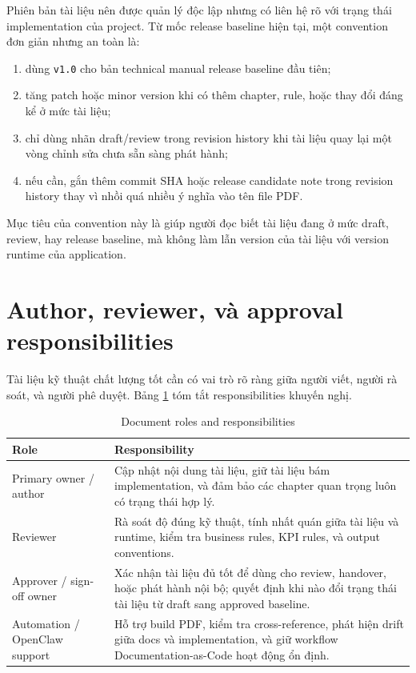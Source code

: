 Phiên bản tài liệu nên được quản lý độc lập nhưng có liên hệ rõ với trạng thái implementation của project. Từ mốc release baseline hiện tại, một convention đơn giản nhưng an toàn là:

\begin{enumerate}[label=-]
\item dùng \texttt{v1.0} cho bản technical manual release baseline đầu tiên;
\item tăng patch hoặc minor version khi có thêm chapter, rule, hoặc thay đổi đáng kể ở mức tài liệu;
\item chỉ dùng nhãn draft/review trong revision history khi tài liệu quay lại một vòng chỉnh sửa chưa sẵn sàng phát hành;
\item nếu cần, gắn thêm commit SHA hoặc release candidate note trong revision history thay vì nhồi quá nhiều ý nghĩa vào tên file PDF.
\end{enumerate}

Mục tiêu của convention này là giúp người đọc biết tài liệu đang ở mức draft, review, hay release baseline, mà không làm lẫn version của tài liệu với version runtime của application.

\section{Author, reviewer, và approval responsibilities}

Tài liệu kỹ thuật chất lượng tốt cần có vai trò rõ ràng giữa người viết, người rà soát, và người phê duyệt. Bảng \ref{tab:document_roles} tóm tắt responsibilities khuyến nghị.

\begin{table}[htbp]
	\centering
	\renewcommand{\arraystretch}{1.3}
	\caption{Document roles and responsibilities}
	\label{tab:document_roles}
	\begin{tabularx}{\linewidth}{|>{\RaggedRight\arraybackslash}p{2.7cm}|>{\RaggedRight\arraybackslash}X|}
		\hline
		\textbf{Role} & \textbf{Responsibility} \\ \hline
		Primary owner / author & Cập nhật nội dung tài liệu, giữ tài liệu bám implementation, và đảm bảo các chapter quan trọng luôn có trạng thái hợp lý. \\ \hline
		Reviewer & Rà soát độ đúng kỹ thuật, tính nhất quán giữa tài liệu và runtime, kiểm tra business rules, KPI rules, và output conventions. \\ \hline
		Approver / sign-off owner & Xác nhận tài liệu đủ tốt để dùng cho review, handover, hoặc phát hành nội bộ; quyết định khi nào đổi trạng thái tài liệu từ draft sang approved baseline. \\ \hline
		Automation / OpenClaw support & Hỗ trợ build PDF, kiểm tra cross-reference, phát hiện drift giữa docs và implementation, và giữ workflow Documentation-as-Code hoạt động ổn định. \\ \hline
	\end{tabularx}
\end{table}

